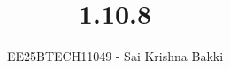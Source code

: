 \documentclass[journal]{IEEEtran}
\begin{document}

\vspace{3cm}

\title{1.10.8}
\author{EE25BTECH11049 - Sai Krishna Bakki}
 \maketitle
{\let\newpage\relax\maketitle}

\renewcommand{\thefigure}{\theenumi}
\renewcommand{\thetable}{\theenumi}
\setlength{\intextsep}{10pt} %


\renewcommand{\thetable}{\theenumi}
\end{document}
